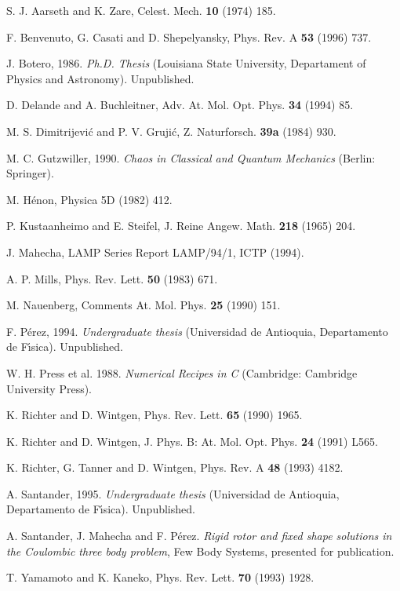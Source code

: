 \documentclass[thmsa]{article}
\begin{document}
\begin{thebibliography}{99}
  S. J. Aarseth and K. Zare, Celest. Mech. \textbf{10}
(1974) 185.

  F. Benvenuto, G. Casati and D. Shepelyansky, Phys. Rev.
A \textbf{53} (1996) 737.

  J. Botero, 1986. \emph{Ph.D. Thesis} (Louisiana State
University, Departament of Physics and Astronomy). Unpublished.

  D. Delande and A. Buchleitner, Adv. At. Mol. Opt. Phys. 
\textbf{34} (1994) 85.

  M. S. Dimitrijevi\'c and P. V. Gruji\'c, Z. Naturforsch. 
\textbf{39a} (1984) 930.

  M. C. Gutzwiller, 1990. \emph{Chaos in Classical and
Quantum Mechanics} (Berlin: Springer).

  M. H\'enon, Physica 5D (1982) 412.

  P. Kustaanheimo and E. Steifel, J. Reine Angew. Math. 
\textbf{218} (1965) 204.

  J. Mahecha, LAMP Series Report LAMP/94/1, ICTP
(1994).

  A. P. Mills, Phys. Rev. Lett. \textbf{50} (1983) 671.

  M. Nauenberg, Comments At. Mol. Phys. \textbf{25}
(1990) 151.

  F. P\'erez, 1994. \emph{Undergraduate thesis} (Universidad
de Antioquia, Departamento de F\'\i sica). Unpublished.

  W. H. Press et al. 1988. \emph{Numerical Recipes in C}
(Cambridge: Cambridge University Press).

  K. Richter and D. Wintgen, Phys. Rev. Lett. 
\textbf{65} (1990) 1965.

  K. Richter and D. Wintgen, J. Phys. B: At. Mol.
Opt. Phys. \textbf{24} (1991) L565.

  K. Richter, G. Tanner and D. Wintgen, Phys.
Rev. A \textbf{48} (1993) 4182.

  A. Santander, 1995. \emph{Undergraduate thesis}
(Universidad de Antioquia, Departamento de F\'\i sica). Unpublished.

  A. Santander, J. Mahecha and F. P\'erez. \emph{Rigid
rotor and fixed shape solutions in the Coulombic three body problem}, Few
Body Systems, presented for publication.

  T. Yamamoto and K. Kaneko, Phys. Rev. Lett. \textbf{70 }%
(1993) 1928.
\end{thebibliography}
\end{document}
